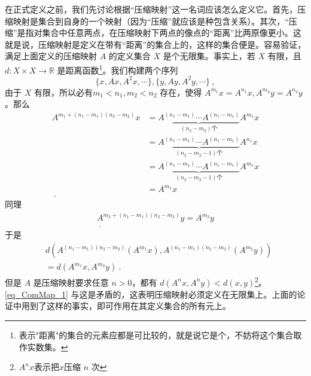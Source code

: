 在正式定义之前，我们先讨论根据“压缩映射”这一名词应该怎么定义它。首先，压缩映射是集合到自身的一个映射（因为“压缩”就应该是种包含关系）。其次，“压缩”是指对集合中任意两点，在压缩映射下两点的像点的“距离”比两原像更小。这就是说，压缩映射是定义在带有“距离”的集合上的，这样的集合便是。容易验证，满足上面定义的压缩映射 $A$ 的定义集合 $X$ 是个无限集。事实上，若 $X$ 有限，且 $d:X\times X\rightarrow \mathbb R$ 是距离函数\footnote{表示"距离"的集合的元素应都是可比较的，就是说它是个，不妨将这个集合取作实数集。}。我们构建两个序列
\begin{equation}
\{x,Ax,A^2x,\cdots\},\{y,Ay,A^2y,\cdots\}~,
\end{equation}
由于 $X$ 有限，所以必有$m_1<n_1,m_2<n_2$ 存在，使得 $A^{m_1}x=A^{n_1}x,A^{m_2}y=A^{n_2}y$ 。那么
\begin{equation}
\begin{aligned}
A^{m_1+(n_1-m_1)(n_2-m_2)}x&=\underbrace{A^{(n_1-m_1)}\cdots A^{(n_1-m_1)}}_{(n_2-m_2)\text{个}}A^{m_1}x\\
&=\underbrace{A^{(n_1-m_1)}\cdots A^{(n_1-m_1)}}_{(n_2-m_2-1)\text{个}}A^{n_1}x\\
&=\underbrace{A^{(n_1-m_1)}\cdots A^{(n_1-m_1)}}_{(n_2-m_2-1)\text{个}}A^{m_1}x\\
&=A^{m_1}x\\~.
\end{aligned}
\end{equation}
同理
\begin{equation}
\begin{aligned}
A^{m_2+(n_1-m_1)(n_2-m_2)}y=A^{m_2}y\\~.
\end{aligned}
\end{equation}
于是
\begin{equation}\label{eq_ComMap_1}
\begin{aligned}
&d(A^{(n_1-m_1)(n_2-m_2)}(A^{m_1}x),A^{(n_1-m_1)(n_2-m_2)}(A^{m_2}y))\\
&=d(A^{m_1}x,A^{m_2}y)~.
\end{aligned}
\end{equation}
但是 $A$ 是压缩映射要求任意 $n>0$，都有 $d(A^n x,A^n y)<d(x,y)$\footnote{$A^n x$表示把$x$压缩 $n$ 次}。\autoref{eq_ComMap_1} 与这是矛盾的，这表明压缩映射必须定义在无限集上。上面的论证中用到了这样的事实，即可作用在其定义集合的所有元上。

